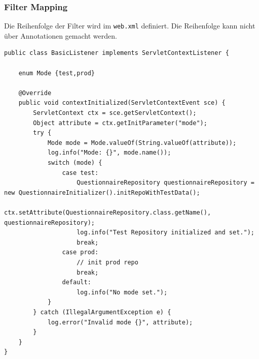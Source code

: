 \subsubsection{Filter Mapping}
Die Reihenfolge der Filter wird im \texttt{web.xml} definiert.
Die Reihenfolge kann nicht über Annotationen gemacht werden.
\begin{verbatim}
public class BasicListener implements ServletContextListener {
 
    enum Mode {test,prod}
 
    @Override
    public void contextInitialized(ServletContextEvent sce) {
        ServletContext ctx = sce.getServletContext();
        Object attribute = ctx.getInitParameter("mode");
        try {
            Mode mode = Mode.valueOf(String.valueOf(attribute));
            log.info("Mode: {}", mode.name());
            switch (mode) {
                case test:
                    QuestionnaireRepository questionnaireRepository = new QuestionnaireInitializer().initRepoWithTestData();
                    ctx.setAttribute(QuestionnaireRepository.class.getName(), questionnaireRepository);
                    log.info("Test Repository initialized and set.");
                    break;
                case prod:
                    // init prod repo 
                    break;
                default:
                    log.info("No mode set.");
            }
        } catch (IllegalArgumentException e) {
            log.error("Invalid mode {}", attribute);
        }
    }
}
\end{verbatim}
